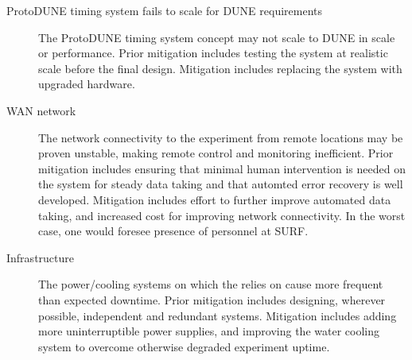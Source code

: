 \begin{description}


\item[ProtoDUNE timing system fails to scale for DUNE requirements] The ProtoDUNE timing system concept may
  not scale to DUNE in scale or performance.  Prior mitigation
  includes testing the system at realistic scale before the final
  design. Mitigation includes replacing the system with upgraded
  hardware.


\item[WAN network] The network connectivity to the experiment from
  remote locations may be proven unstable, making remote control and monitoring
  inefficient. Prior mitigation includes ensuring that minimal human intervention
  is needed on the system for steady data taking and that automted
  error recovery is well developed. Mitigation includes effort to further
  improve automated data taking, and increased cost for improving network
  connectivity. In the worst case, one would foresee presence of personnel at SURF.

\item[Infrastructure] The power/cooling systems on which the 
  relies on cause more frequent than expected downtime. Prior
  mitigation includes designing, wherever possible, independent and redundant
  systems. Mitigation includes adding more uninterruptible power
  supplies, and improving the water cooling system to overcome otherwise
  degraded experiment uptime. 


\end{description}
